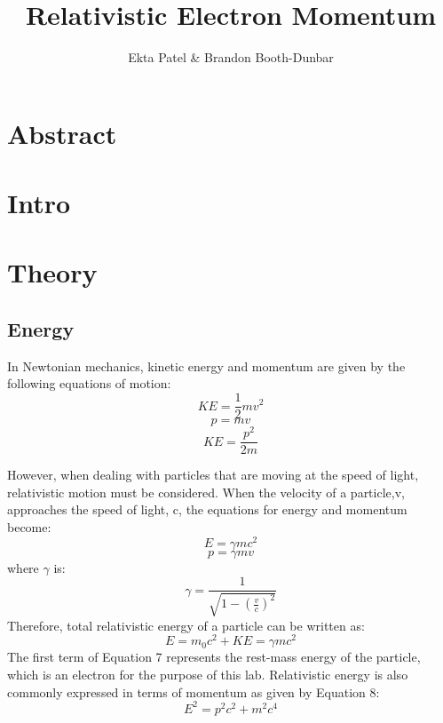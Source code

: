 


\newcommand{\ig}[2][width=4in]{\texttt{[image: \#2]}}    		
\usepackage{graphicx}					
\usepackage{amssymb}
\usepackage{pgfplotstable}
\usepackage{float}
\usepackage{caption}
\captionsetup[table]{justification=justified,singlelinecheck=false}


\header {\today}							
\title{Relativistic Electron Momentum}
\author{Ekta Patel \& Brandon Booth-Dunbar}



\section{Abstract}
\begin{em}
\end{em}

\section{Intro}

\section{Theory}

\subsection{Energy}
In Newtonian mechanics, kinetic energy and momentum are given by the following equations of motion:
\begin{equation}KE= \frac{1}{2}mv^2 \end{equation}
\begin{equation} p=mv \end{equation}
\begin {equation}KE=\frac{p^2}{2m} \end{equation}

However, when dealing with particles that are moving at the speed of light, relativistic motion must be considered. When the velocity of a particle,v, approaches the speed of light, c, the equations for energy and momentum become:
\begin{equation} E=\gamma mc^2\end{equation}
\begin{equation} p=\gamma mv\end{equation}
where $\gamma$ is:
\begin{equation} \gamma= \frac{1}{\sqrt{1-(\frac{v}{c})^2}}\end{equation}
Therefore, total relativistic energy of a particle can be written as:
\begin{equation} E=m_0c^2+KE=\gamma mc^2\end{equation}
The first term of Equation 7 represents the rest-mass energy of the particle, which is an electron for the purpose of this lab. Relativistic energy is also commonly expressed in terms of momentum as given by Equation 8:
\begin{equation}E^2=p^2c^2+m^2c^4\end{equation}
